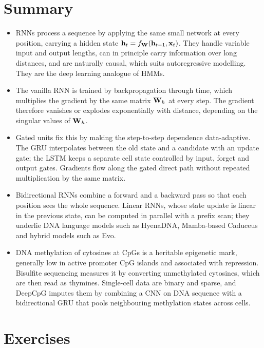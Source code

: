 \section{Summary}

\begin{itemize}
  \item RNNs process a sequence by applying the same small network at every position, carrying a hidden state $\mathbf{h}_t=f_{\mathbf{W}}(\mathbf{h}_{t-1},\mathbf{x}_t)$. They handle variable input and output lengths, can in principle carry information over long distances, and are naturally causal, which suits autoregressive modelling. They are the deep learning analogue of HMMs.
  \item The vanilla RNN is trained by backpropagation through time, which multiplies the gradient by the same matrix $\mathbf{W}_h$ at every step. The gradient therefore vanishes or explodes exponentially with distance, depending on the singular values of $\mathbf{W}_h$.
  \item Gated units fix this by making the step-to-step dependence data-adaptive. The GRU interpolates between the old state and a candidate with an update gate; the LSTM keeps a separate cell state controlled by input, forget and output gates. Gradients flow along the gated direct path without repeated multiplication by the same matrix.
  \item Bidirectional RNNs combine a forward and a backward pass so that each position sees the whole sequence. Linear RNNs, whose state update is linear in the previous state, can be computed in parallel with a prefix scan; they underlie DNA language models such as HyenaDNA, Mamba-based Caduceus and hybrid models such as Evo.
  \item DNA methylation of cytosines at CpGs is a heritable epigenetic mark, generally low in active promoter CpG islands and associated with repression. Bisulfite sequencing measures it by converting unmethylated cytosines, which are then read as thymines. Single-cell data are binary and sparse, and DeepCpG imputes them by combining a CNN on DNA sequence with a bidirectional GRU that pools neighbouring methylation states across cells.
\end{itemize}

\section*{Exercises}


